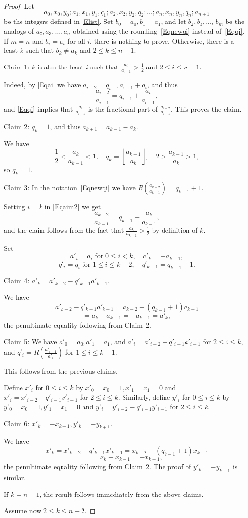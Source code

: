 \documentclass[12pt,letterpaper]{article}
\theoremstyle{definition}
\begin{document}
\begin{proof}
Let 
$$
a_0,x_0,y_0; a_1,x_1,y_1,q_1; a_2,x_2,y_2,q_2; \ldots ; a_n,x_n,y_n,q_n; a_{n+1}
$$ 
be the integers defined in \eqref{Elist}. Set $b_0=a_0, b_1=a_1$, and let $b_2, b_3, \ldots$, $b_m$ be the analogs of $a_2, a_3, \ldots, a_n$ obtained using the rounding~\eqref{Eqnewqi} instead of~\eqref{Eqqi}. If $m=n$ and $b_i=a_i$ for all $i$, there is nothing to prove. Otherwise, there is a least $k$ such that $b_k\ne a_k$ and $2\le k\le n-1$. 

Claim 1: $k$ is also the least $i$ such that $\frac{a_i}{a_{i-1}}>\frac{1}{2}$ and $2\le i\le n-1$. 

Indeed, by \eqref{Eqai} we have $a_{i-2}=q_{i-1} a_{i-1}+a_i$, and thus 
\begin{equation}\label{Eqaim2}
\frac{a_{i-2}}{a_{i-1}}=q_{i-1}+\frac{a_i}{a_{i-1}},
\end{equation} 
and \eqref{Eqqi} implies that $\frac{a_i}{a_{i-1}}$ is the fractional part of $\frac{a_{i-2}}{a_{i-1}}$. This proves the claim. 

Claim 2: $q_k=1$, and thus $a_{k+1}=a_{k-1}-a_k$. 

We have 
\[
\frac{1}{2}<\frac{a_k}{a_{k-1}}<1,\quad q_k=\left\lfloor\frac{a_{k-1}}{a_k}\right\rfloor,\quad 2>\frac{a_{k-1}}{a_k}>1,
\] 
so $q_k=1$. 

Claim 3: In the notation~\eqref{Eqnewqi} we have $R(\frac{a_{k-2}}{a_{k-1}})=q_{k-1}+1$. 

Setting $i=k$ in \eqref{Eqaim2} we get 
\[
\frac{a_{k-2}}{a_{k-1}}=q_{k-1}+\frac{a_k}{a_{k-1}},
\] 
and the claim follows from the fact that $\frac{a_k}{a_{k-1}}>\frac{1}{2}$ by definition of $k$. 

Set 
$$
a'_i=a_i \text{ for } 0\le i<k, \quad a'_k=-a_{k+1},
$$ 
$$
q'_i=q_i\text{ for } 1\le i\le k-2,\quad q'_{k-1}=q_{k-1}+1.
$$ 

Claim 4: $a'_k=a'_{k-2}-q'_{k-1}a'_{k-1}$. 

We have 
\[
a'_{k-2}-q'_{k-1}a'_{k-1}=a_{k-2}-(q_{k-1}+1)a_{k-1}
\] 
\[
=a_k-a_{k-1}=-a_{k+1}=a'_k,
\] 
the penultimate equality following from Claim~2. 

Claim 5: We have $a'_0=a_0, a'_1=a_1$, and $a'_i=a'_{i-2}-q'_{i-1}a'_{i-1}$ for $2\le i\le k$, and $q'_i=R(\frac{a'_{i-1}}{a'_i})$ for $1\le i\le k-1$. 

This follows from the previous claims. 

Define $x'_i$ for $0\le i\le k$ by $x'_0=x_0=1, x'_1=x_1=0$ and $x'_i=x'_{i-2}-q'_{i-1}x'_{i-1}$ for $2\le i\le k$. Similarly, define $y'_i$ for $0\le i\le k$ by $y'_0=x_0=1, y'_1=x_1=0$ and $y'_i=y'_{i-2}-q'_{i-1}y'_{i-1}$ for $2\le i\le k$. 

Claim 6: $x'_k=-x_{k+1}, y'_k=-y_{k+1}$. 

We have 
\[
x'_k=x'_{k-2}-q'_{k-1}x'_{k-1}=x_{k-2}-(q_{k-1}+1)x_{k-1}
\] 
\[
=x_k-x_{k-1}=-x_{k+1},
\] 
the penultimate equality following from Claim~2. The proof of $y'_k=-y_{k+1}$ is similar. 

If $k=n-1$, the result follows immediately from the above claims. 

Assume now $2\le k\le n-2$. 
\end{proof}
\end{document}
